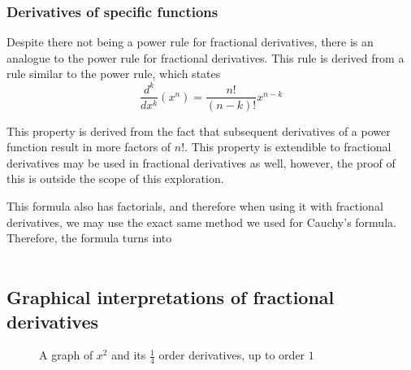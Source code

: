 \documentclass{article}
\begin{document}
\subsubsection{Derivatives of specific functions}

Despite there not being a power rule for fractional derivatives, there is an
analogue to the power rule for fractional derivatives. This rule is derived from
a rule similar to the power rule, which states
$$
\frac{d^k}{dx^k} \left(x^n\right) = \frac{n!}{\left(n-k\right)!} x^{n-k}
$$

This property is derived from the fact that subsequent derivatives of a power
function result in more factors of $n!$. This property is extendible to
fractional derivatives may be used in fractional derivatives as well, however,
the proof of this is outside the scope of this exploration.

This formula also has factorials, and therefore when using it with fractional
derivatives, we may use the exact same method we used for Cauchy's formula.
Therefore, the formula turns into
$$
\frac{}{}
$$

\subsection{Graphical interpretations of fractional derivatives}

\begin{figure}[H]
\def\figonexmax{15}
\centering
{}
\caption{A graph of $x^2$ and its $\frac{1}{4}$ order derivatives, up to order $1$} \label{xsquaredgraph}
\end{figure}
\end{document}
